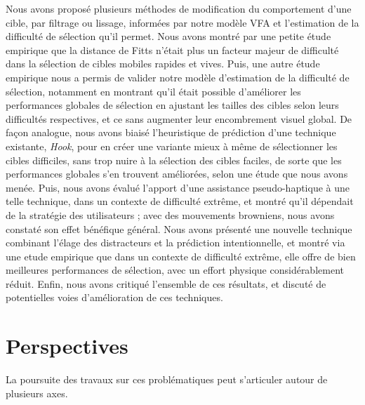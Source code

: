 	Nous avons proposé plusieurs méthodes de modification du comportement d'une cible, par filtrage ou lissage, informées par notre modèle VFA et l'estimation de la difficulté de sélection qu'il permet. Nous avons montré par une petite étude empirique que la distance de Fitts n'était plus un facteur majeur de difficulté dans la sélection de cibles mobiles rapides et vives. Puis, une autre étude empirique nous a permis de valider notre modèle d'estimation de la difficulté de sélection, notamment en montrant qu'il était possible d'améliorer les performances globales de sélection en ajustant les tailles des cibles selon leurs difficultés respectives, et ce sans augmenter leur encombrement visuel global. De façon analogue, nous avons biaisé l'heuristique de prédiction d'une technique existante, \emph{Hook}, pour en créer une variante mieux à même de sélectionner les cibles difficiles, sans trop nuire à la sélection des cibles faciles, de sorte que les performances globales s'en trouvent améliorées, selon une étude que nous avons menée. Puis, nous avons évalué l'apport d'une assistance pseudo-haptique à une telle technique, dans un contexte de difficulté extrême, et montré qu'il dépendait de la stratégie des utilisateurs ; avec des mouvements browniens, nous avons constaté son effet bénéfique général. Nous avons présenté une nouvelle technique combinant l'élage des distracteurs et la prédiction intentionnelle, et montré via une etude empirique que dans un contexte de difficulté extrême, elle offre de bien meilleures performances de sélection, avec un effort physique considérablement réduit. Enfin, nous avons critiqué l'ensemble de ces résultats, et discuté de potentielles voies d'amélioration de ces techniques.
	
	\section*{Perspectives}
	La poursuite des travaux sur ces problématiques peut s'articuler autour de plusieurs axes.
	
